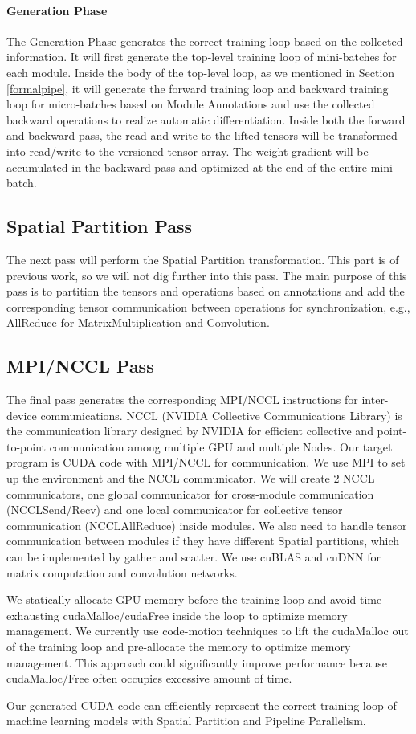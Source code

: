 \documentclass[sigplan, nonacm]{acmart}\settopmatter{printfolios=true,printccs=false,printacmref=false}
\begin{document}
\paragraph{Generation Phase}
The Generation Phase generates the correct training loop based on the collected information. It will first generate the top-level training loop of mini-batches for each module. Inside the body of the top-level loop, as we mentioned in Section \ref{formalpipe}, it will generate the forward training loop and backward training loop for micro-batches based on Module Annotations and use the collected backward operations to realize automatic differentiation. Inside both the forward and backward pass, the read and write to the lifted tensors will be transformed into read/write to the versioned tensor array. The weight gradient will be accumulated in the backward pass and optimized at the end of the entire mini-batch.\par
\subsection{Spatial Partition Pass}
The next pass will perform the Spatial Partition transformation. This part is of previous work, so we will not dig further into this pass. The main purpose of this pass is to partition the tensors and operations based on annotations and add the corresponding tensor communication between operations for synchronization, e.g., AllReduce for MatrixMultiplication and Convolution.\par
\subsection{MPI/NCCL Pass}
The final pass generates the corresponding MPI/NCCL instructions for inter-device communications. NCCL (NVIDIA Collective Communications Library) is the communication library designed by NVIDIA for efficient collective and point-to-point communication among multiple GPU and multiple Nodes. Our target program is CUDA code with MPI/NCCL for communication. We use MPI to set up the environment and the NCCL communicator. We will create 2 NCCL communicators, one global communicator for cross-module communication (NCCLSend/Recv) and one local communicator for collective tensor communication (NCCLAllReduce) inside modules. We also need to handle tensor communication between modules if they have different Spatial partitions, which can be implemented by gather and scatter. We use cuBLAS and cuDNN for matrix computation and convolution networks.\par
We statically allocate GPU memory before the training loop and avoid time-exhausting cudaMalloc/cudaFree inside the loop to optimize memory management. We currently use code-motion techniques to lift the cudaMalloc out of the training loop and pre-allocate the memory to optimize memory management. This approach could significantly improve performance because cudaMalloc/Free often occupies excessive amount of time.\par
Our generated CUDA code can efficiently represent the correct training loop of machine learning models with Spatial Partition and Pipeline Parallelism.
\end{document}
